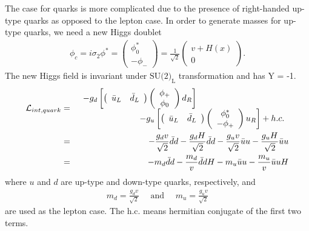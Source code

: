 The case for quarks is more complicated due to the presence of right-handed up-type 
quarks as opposed to the lepton case. In order to generate masses for up-type 
quarks, we need a new Higgs doublet 
\begin{eqnarray} 
\phi_c 
= i \sigma_2 \phi^* 
=  \left(  \begin{array}{c} \phi_0^* \\ -\phi_- \end{array} \right) 
=  \frac{1}{\sqrt{2}} \left(  \begin{array}{c} v + H(x) \\ 0 \end{array} \right). 
\end{eqnarray} 
The new Higgs field is invariant under $\textrm{SU(2)}_\textrm{L}$ transformation and has Y = -1. 
\begin{eqnarray} 
\mathcal{L}_{int, quark} 
&=& 
\begin{array}{ccc} \multicolumn{2}{c}{\displaystyle 
-g_{d} \left[ 
\left(  \begin{array}{cc} \bar{u}_L & \bar{d}_L \end{array} \right)
\left(  \begin{array}{c} \phi_+  \\ \phi_0 \end{array} \right) d_R  \right]
} & \\ & \multicolumn{2}{c}{\hspace{2cm} \displaystyle
-g_{u} \left[ 
\left(  \begin{array}{cc} \bar{u}_L & \bar{d}_L \end{array} \right)
\left(  \begin{array}{c} \phi_0^*  \\ -\phi_+ \end{array} \right) u_R  \right] 
+ h.c. 
} \end{array}   \\ 
&=&  
-\frac{g_d v}{\sqrt{2}} \bar{d}d - \frac{g_d H}{\sqrt{2}} \bar{d}d  
-\frac{g_u v}{\sqrt{2}} \bar{u}u - \frac{g_u H}{\sqrt{2}} \bar{u}u \\
&=&  
- m_d \bar{d}d  -\frac{m_d}{v} \bar{d}d H
- m_u \bar{u}u  -\frac{m_u}{v} \bar{u}u H
\end{eqnarray} 
where $u$ and $d$ are up-type and down-type quarks, respectively, and   
\begin{eqnarray} 
m_d = \frac{g_d v}{\sqrt{2}} \quad \textrm{ and } \quad   
m_u = \frac{g_u v}{\sqrt{2}}
\end{eqnarray} 
are used as the lepton case. The h.c. means hermitian conjugate of the first two terms. 

